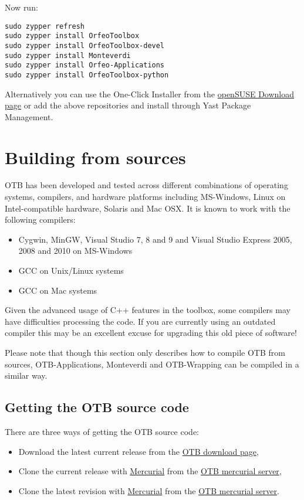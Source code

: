 Now run:
\begin{verbatim}
sudo zypper refresh
sudo zypper install OrfeoToolbox
sudo zypper install OrfeoToolbox-devel
sudo zypper install Monteverdi
sudo zypper install Orfeo-Applications
sudo zypper install OrfeoToolbox-python
\end{verbatim}

Alternatively you can use the One-Click Installer from the \href{http://software.opensuse.org/search?q=Orfeo&baseproject=openSUSE\%3A11.4&lang=en&include_home=true&exclude_debug=true}{openSUSE Download page} or add the above repositories and install through Yast Package Management.


\section{Building from sources}
\label{sec:source}
OTB has been developed and tested across different combinations of
operating systems, compilers, and hardware platforms including
MS-Windows, Linux on Intel-compatible hardware, Solaris and Mac
OSX.  It is known to work with the following compilers:
\begin{itemize}
\item Cygwin, MinGW, Visual Studio 7, 8 and 9 and Visual Studio Express 2005, 
  2008 and 2010 on MS-Windows%
\item GCC on Unix/Linux systems
\item GCC on Mac systems
\end{itemize}

Given the advanced usage of C++ features in the toolbox, some
compilers may have difficulties processing the code. If you are
currently using an outdated compiler this may be an excellent excuse
for upgrading this old piece of software!

Please note that though this section only describes how to compile OTB from sources,
OTB-Applications, Monteverdi and OTB-Wrapping can be compiled in a similar way.

\subsection{Getting the OTB source code}

There are three ways of getting the OTB source code:
\begin{itemize}
\item Download the latest current release from the \href{http://sourceforge.net/projects/orfeo-toolbox/}{OTB download page},
\item Clone the current release with \href{http://mercurial.selenic.com}{Mercurial} from the \href{http://hg.orfeo-toolbox.org/OTB}{OTB mercurial server},
\item Clone the latest revision with \href{http://mercurial.selenic.com}{Mercurial} from the \href{http://hg.orfeo-toolbox.org/OTB}{OTB mercurial server}.
\end{itemize}

